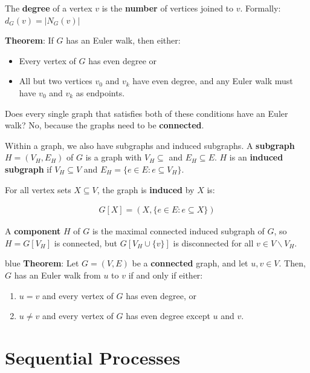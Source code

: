 \documentclass[11pt,a4paper,titlepage,dvipsnames,cmyk]{scrartcl}
\begin{document}
The \textbf{degree} of a vertex $v$ is the \textbf{number} of vertices
joined to $v$. Formally: $d_G(v) = |N_G(v)|$

\textbf{Theorem}: If $G$ has an Euler walk, then either:
\begin{itemize}
    \item Every vertex of $G$ has even degree or
    \item All but two vertices $v_0$ and $v_k$ have even degree, and any
        Euler walk must have $v_0$ and $v_k$ as endpoints.
\end{itemize}

Does every single graph that satisfies both of these conditions have an
Euler walk? No, because the graphs need to be \textbf{connected}.

Within a graph, we also have subgraphs and induced subgraphs. A
\textbf{subgraph} $H = (V_H, E_H)$ of $G$ is a graph with $V_H \subseteq$
and $E_H \subseteq E$. $H$ is an \textbf{induced subgraph} if $V_H
\subseteq V$ and $E_H = \{ e \in E : e \subseteq V_H\}$.

For all vertex sets $X \subseteq V$, the graph is \textbf{induced} by $X$
is:

\begin{center}
    \begin{align*}
        G[X] = (X, \{e \in E: e \subseteq X \})
    \end{align*}
\end{center}

A \textbf{component} $H$ of $G$ is the maximal connected induced subgraph
of $G$, so $H = G[V_H]$ is connected, but $G[V_H \cup \{v\}]$ is
disconnected for all $v \in V \backslash V_H$.

\begin{blue}{blue}
    \textbf{Theorem}: Let $G = (V,E)$ be a \textbf{connected} graph, and
    let $u,v \in V$. Then, $G$ has an Euler walk from $u$ to $v$ if and
    only if either:
    \begin{enumerate}
        \item $u = v$ and every vertex of $G$ has even degree, or
        \item $u \not = v$ and every vertex of $G$ has even degree except
            $u$ and $v$.
    \end{enumerate}
\end{blue}

\section{Sequential Processes}%
\label{sec:sequential-processes}
\end{document}
